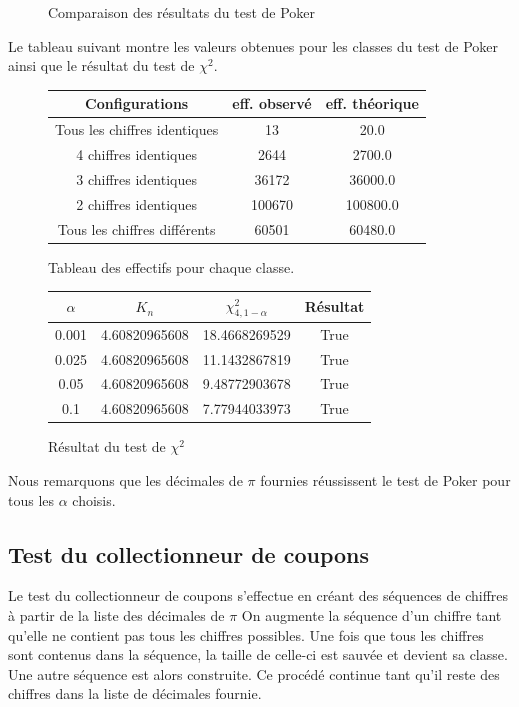 \documentclass[10pt,a4paper]{article}
\begin{document}
\begin{figure}[H]
\caption{Comparaison des résultats du test de Poker}
\label{pokerhisto}
\end{figure}

Le tableau suivant montre les valeurs obtenues pour les classes du test de Poker ainsi que le résultat du test de $\chi^2$.
\begin{figure}[H]
\begin{center}
\begin{longtable}{|c|c|c|}
\hline
Configurations & eff. observé & eff. théorique\\
\hline
Tous les chiffres identiques & 13 & 20.0\\
4 chiffres identiques & 2644 & 2700.0\\
3 chiffres identiques & 36172 & 36000.0\\
2 chiffres identiques & 100670 & 100800.0\\
Tous les chiffres différents & 60501 & 60480.0\\
\hline
\end{longtable}
\end{center}
\caption{Tableau des effectifs pour chaque classe.}
\end{figure}
\begin{figure}[H]
\begin{center}
\begin{tabular}{|c|c|c|c|}
\hline
$\alpha$ & $K_{n}$ & $\chi^2_{4, 1 - \alpha}$ & Résultat\\
\hline
0.001 & 4.60820965608 & 18.4668269529 & True\\
0.025 & 4.60820965608 & 11.1432867819 & True\\
0.05 & 4.60820965608 & 9.48772903678 & True\\
0.1 & 4.60820965608 & 7.77944033973 & True\\
\hline
\end{tabular}
\end{center}
\caption{Résultat du test de $\chi^2$}
\end{figure} 

Nous remarquons que les décimales de $\pi$ fournies réussissent le test de Poker pour tous les $\alpha$ choisis.
\subsection{Test du collectionneur de coupons}
Le test du collectionneur de coupons s'effectue en créant des séquences de chiffres à partir de la liste des décimales de $\pi$ On augmente la séquence d'un chiffre tant qu'elle ne contient pas tous les chiffres possibles. Une fois que tous les chiffres sont contenus dans la séquence, la taille de celle-ci est sauvée et devient sa classe. Une autre séquence est alors construite. Ce procédé continue tant qu'il reste des chiffres dans la liste de décimales fournie.\newline
\end{document}
